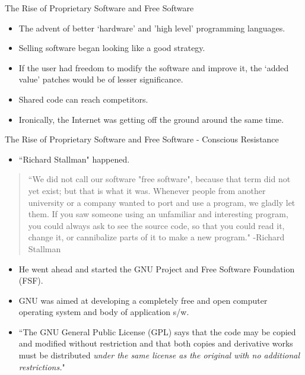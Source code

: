 \documentclass{beamer}
\begin{document}
\begin{frame}{The Rise of Proprietary Software and Free Software}
\begin{itemize}
	\item The advent of better `hardware' and 'high level' programming languages. \pause
	\item Selling software began looking like a good strategy. \pause
	\item If the user had freedom to modify the software and improve it, the `added value' patches would be of lesser significance. \pause
	\item Shared code can reach competitors. \pause
	\item Ironically, the Internet was getting off the ground around the same time.
\end{itemize}
\end{frame}

\begin{frame}{The Rise of Proprietary Software and Free Software - Conscious Resistance}
\begin{itemize}
	\item ``Richard Stallman" happened.
\end{itemize}
\begin{quote}
		\tiny{``We did not call our software "free software", because that term did not yet exist; but that is what it was. Whenever people from another university or a company wanted to port and use a program, we gladly let them. If you saw someone using an unfamiliar and interesting program, you could always ask to see the source code, so that you could read it, change it, or cannibalize parts of it to make a new program." -Richard Stallman}
\end{quote} \pause	
\begin{itemize}
	\item He went ahead and started the GNU Project and Free Software Foundation (FSF). \pause
	\item GNU was aimed at developing a completely free and open computer operating system and body of application s/w. \pause
	\item \small{``The GNU General Public License (GPL) says that the code may be copied and modified without restriction and that both copies and derivative works must be distributed \emph{under the same license as the original with no additional restrictions.}"}
\end{itemize}
\end{frame}
\end{document}
